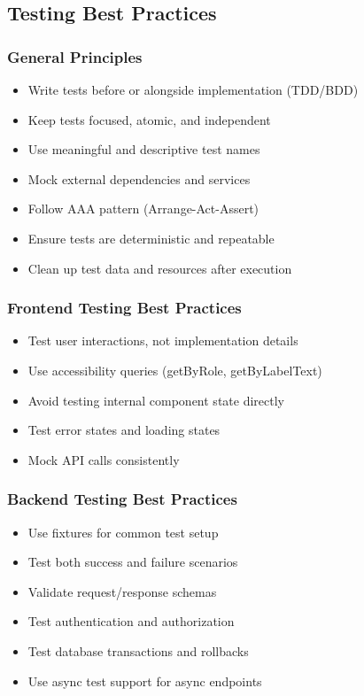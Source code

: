 \documentclass[12pt,a4paper]{article}
\begin{document}
\subsection{Testing Best Practices}

\subsubsection{General Principles}
\begin{itemize}
    \item Write tests before or alongside implementation (TDD/BDD)
    \item Keep tests focused, atomic, and independent
    \item Use meaningful and descriptive test names
    \item Mock external dependencies and services
    \item Follow AAA pattern (Arrange-Act-Assert)
    \item Ensure tests are deterministic and repeatable
    \item Clean up test data and resources after execution
\end{itemize}

\subsubsection{Frontend Testing Best Practices}
\begin{itemize}
    \item Test user interactions, not implementation details
    \item Use accessibility queries (getByRole, getByLabelText)
    \item Avoid testing internal component state directly
    \item Test error states and loading states
    \item Mock API calls consistently
\end{itemize}

\subsubsection{Backend Testing Best Practices}
\begin{itemize}
    \item Use fixtures for common test setup
    \item Test both success and failure scenarios
    \item Validate request/response schemas
    \item Test authentication and authorization
    \item Test database transactions and rollbacks
    \item Use async test support for async endpoints
\end{itemize}
\end{document}

